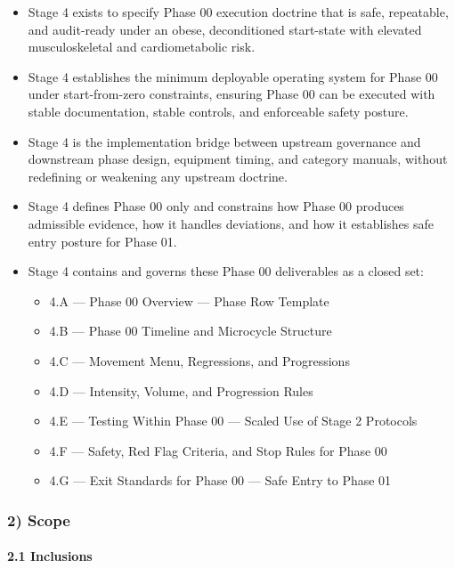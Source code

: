 \documentclass[10pt]{article}
\begin{document}
\begin{itemize}
\item Stage 4 exists to specify Phase 00 execution doctrine that is safe, repeatable, and audit-ready under an obese, deconditioned start-state with elevated musculoskeletal and cardiometabolic risk.
\item Stage 4 establishes the minimum deployable operating system for Phase 00 under start-from-zero constraints, ensuring Phase 00 can be executed with stable documentation, stable controls, and enforceable safety posture.
\item Stage 4 is the implementation bridge between upstream governance and downstream phase design, equipment timing, and category manuals, without redefining or weakening any upstream doctrine.
\item Stage 4 defines Phase 00 only and constrains how Phase 00 produces admissible evidence, how it handles deviations, and how it establishes safe entry posture for Phase 01.
\item Stage 4 contains and governs these Phase 00 deliverables as a closed set:
  \begin{itemize}
  \item 4.A — Phase 00 Overview — Phase Row Template
  \item 4.B — Phase 00 Timeline and Microcycle Structure
  \item 4.C — Movement Menu, Regressions, and Progressions
  \item 4.D — Intensity, Volume, and Progression Rules
  \item 4.E — Testing Within Phase 00 — Scaled Use of Stage 2 Protocols
  \item 4.F — Safety, Red Flag Criteria, and Stop Rules for Phase 00
  \item 4.G — Exit Standards for Phase 00 — Safe Entry to Phase 01
  \end{itemize}
\end{itemize}

\subsubsection*{2) Scope}

\paragraph*{2.1 Inclusions}
\end{document}
